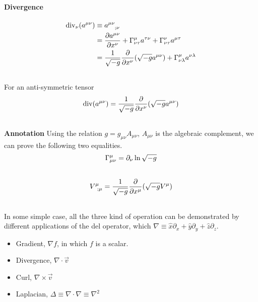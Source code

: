 \documentclass[letterpaper,10pt,english]{sphinxmanual}
\begin{document}
\paragraph{Divergence}
\label{math:divergence}\begin{gather}
\begin{split}\mathrm{div}_\nu(a^{\mu\nu})&\equiv   a^{\mu\nu}_{\phantom{\mu\nu};\nu} \\
& = \frac{\partial a^{\mu\nu}}{\partial x^\nu}+\Gamma^\mu_{\nu\tau}a^{\tau\nu}+\Gamma^\nu_{\nu\tau}a^{\mu\tau} \\
& = \frac1{\sqrt{-g}}\frac{\partial}{\partial x^\nu}(\sqrt{-g}a^{\mu\nu})+\Gamma^\mu_{\nu\lambda}a^{\nu\lambda}\end{split}\notag\\\begin{split}\end{split}\notag
\end{gather}
For an anti-symmetric tensor
\begin{gather}
\begin{split}\mathrm {div}(a^{\mu\nu})=\frac1{\sqrt{-g}}\frac{\partial}{\partial x^\nu}(\sqrt{-g}a^{\mu\nu})\end{split}\notag\\\begin{split}\end{split}\notag
\end{gather}
\textbf{Annotation} Using the relation $g=g_{\mu\nu}A_{\mu\nu}$, $A_{\mu\nu}$ is the algebraic complement, we can prove the following two equalities.
\begin{gather}
\begin{split}\Gamma^\mu_{\mu\nu}=\partial_\nu\ln{\sqrt{-g}}\end{split}\notag\\\begin{split}\end{split}\notag
\end{gather}\begin{gather}
\begin{split}V^\mu_{\phantom\mu;\mu}=\frac1{\sqrt{-g}}\frac{\partial}{\partial x^\mu}(\sqrt{-g}V^\mu)\end{split}\notag\\\begin{split}\end{split}\notag
\end{gather}
In some simple case, all the three kind of operation can be demonstrated by different applications of the del operator, which $\nabla\equiv \hat x\partial_x+\hat y\partial_y+\hat z \partial_z$.
\begin{itemize}
\item {} 
Gradient,  $\nabla f$, in which $f$ is a scalar.

\item {} 
Divergence, $\nabla\cdot \vec v$

\item {} 
Curl, $\nabla \times \vec v$

\item {} 
Laplacian, $\Delta\equiv \nabla\cdot\nabla\equiv \nabla^2$

\end{itemize}
\end{document}
